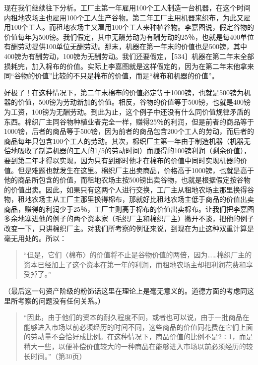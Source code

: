 现在我们继续往下分析。工厂主第一年雇用100个工人制造一台机器，在这个时间内租地农场主也雇用100个工人生产谷物。第二年工厂主用机器来织布，为此又雇用100个工人。而租地农场主又雇用100个工人来种植谷物。李嘉图说，假定谷物的价值每年为500镑。我们假定，其中无酬劳动为有酬劳动的25％，也就是每400单位有酬劳动提供100单位无酬劳动。那末，机器在第一年末的价值也是500镑，其中400镑为有酬劳动，100镑为无酬劳动。我们还要假定，［534］机器在第二年末全部损耗完，加入棉布的价值。实际上李嘉图就是这样假定的，因为在第二年末他拿来同“谷物的价值”比较的不只是棉布的价值，而是“棉布和机器的价值”。

好极了！在这种情况下，第二年末棉布的价值必定等于1000镑，也就是500镑为机器的价值，500镑为劳动新加的价值。相反，谷物的价值等于500镑，也就是400镑为工资，100镑为无酬劳动。到此为止，这个例子中还没有什么同价值规律矛盾的东西。棉织厂主同谷物种植业者完全一样，赚得25％的利润，但是前者的商品等于1000镑，后者的商品等于500镑，因为前者的商品包含200个工人的劳动，而后者的商品每年只包含100个工人的劳动。其次，棉织厂主第一年由于制造机器（机器无偿地吸收了制造机器的工人的1/5的劳动时间）而赚得的100镑利润（剩余价值），要到第二年才得以实现，因为只有到那时他才在棉布的价值中同时实现机器的价值。但是难题也就发生在这里。棉织厂主出卖商品，价格高于1000镑，也就是高于他的商品所包含的价值，而租地农场主按500镑出卖谷物，也就是根据假定按谷物的价值出卖。因此，如果只有这两个人进行交换，工厂主从租地农场主那里换得谷物，租地农场主从工厂主那里换得棉布，那就好比租地农场主低于商品的价值出卖商品，赚得的利润少于25％，工厂主则高于棉布的价值出卖棉布。让我们把李嘉图多余地塞进他的例子的两个资本家（毛织厂主和棉织厂主）撇开不谈，把他的例子改变一下，只讲棉织厂主。对我们所考察的例证来说，到现在为止这种双重计算是毫无用处的。所以：

\begin{quote}{“但是，它们〈棉布〉的价值将不止是谷物价值的两倍，因为……棉织厂主的资本已经加上了这个资本在第一年的利润，而租地农场主却把利润花费和享受掉了。”}\end{quote}

（最后这一句资产阶级的粉饰话这里在理论上是毫无意义的。道德方面的考虑同这里所考察的问题没有任何关系。）

\begin{quote}{“因此，由于他们的资本的耐久程度不同，或者也可以说，由于一批商品在能够进入市场以前必须经历的时间不同，这些商品的价值同花费在它们上面的劳动量不会恰好成比例。在这种情况下，商品价值的比例不是2∶1，而是稍大一些，以便补偿价值较大的一种商品在能够进入市场以前必须经历的较长时间。”（第30页）}\end{quote}


